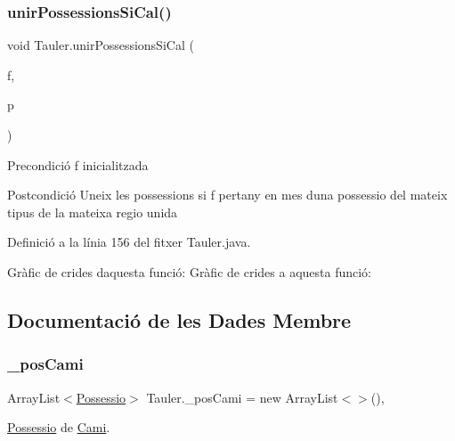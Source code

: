 \subsubsection{\texorpdfstring{unir\+Possessions\+Si\+Cal()}{unirPossessionsSiCal()}}
{\footnotesize\ttfamily void Tauler.\+unir\+Possessions\+Si\+Cal (\begin{DoxyParamCaption}\item[{\mbox{\hyperlink{class_fitxa}{Fitxa}}}]{f,  }\item[{Array\+List$<$ \mbox{\hyperlink{class_possessio}{Possessio}} $>$}]{p }\end{DoxyParamCaption})\hspace{0.3cm}{\ttfamily [private]}}

\begin{DoxyPrecond}{Precondició}
f inicialitzada 
\end{DoxyPrecond}
\begin{DoxyPostcond}{Postcondició}
Uneix les possessions si f pertany en mes d\textquotesingle{}una possessio del mateix tipus de la mateixa regio unida 
\end{DoxyPostcond}


Definició a la línia 156 del fitxer Tauler.\+java.

Gràfic de crides d\textquotesingle{}aquesta funció\+:
Gràfic de crides a aquesta funció\+:


\subsection{Documentació de les Dades Membre}
\mbox{\label{class_tauler_acec61a0661595f4b04a2ea653573b830}} 
\subsubsection{\texorpdfstring{\+\_\+pos\+Cami}{\_posCami}}
{\footnotesize\ttfamily Array\+List$<$\mbox{\hyperlink{class_possessio}{Possessio}}$>$ Tauler.\+\_\+pos\+Cami = new Array\+List$<$$>$()\hspace{0.3cm}{\ttfamily [static]}, {\ttfamily [private]}}



\mbox{\hyperlink{class_possessio}{Possessio}} de \mbox{\hyperlink{class_cami}{Cami}}. 



